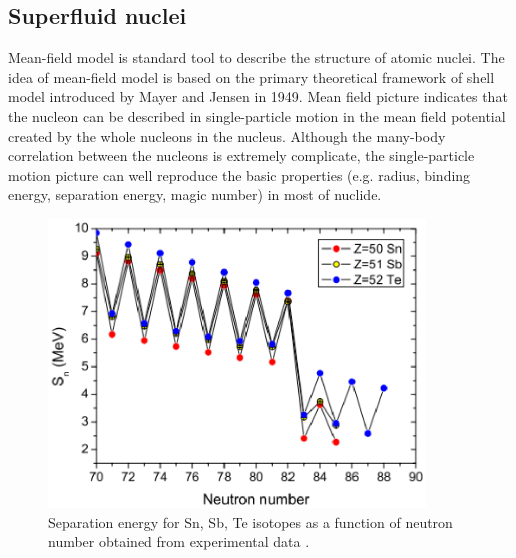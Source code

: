 \documentclass[11pt]{book} %
\begin{document}
\subsection{Superfluid nuclei}

Mean-field model is standard tool to describe the structure of atomic nuclei. The idea of mean-field model is based on the primary theoretical framework of shell model introduced by Mayer and Jensen in 1949. Mean field picture indicates that the nucleon can be described in single-particle motion in the mean field potential created by the whole nucleons in the nucleus. Although the many-body correlation between the nucleons is extremely complicate, the single-particle motion picture can well reproduce the basic properties (e.g. radius, binding energy, separation energy, magic number) in most of nuclide. %

\begin{figure}[tb]
 \begin{center}
    \includegraphics[width=100mm]{images/S_n.eps}
 \end{center}
  \caption{Separation energy for Sn, Sb, Te isotopes as a function of neutron number obtained from experimental data \cite{KJJ12}.}
  \label{S_n}
\end{figure}
\end{document}

